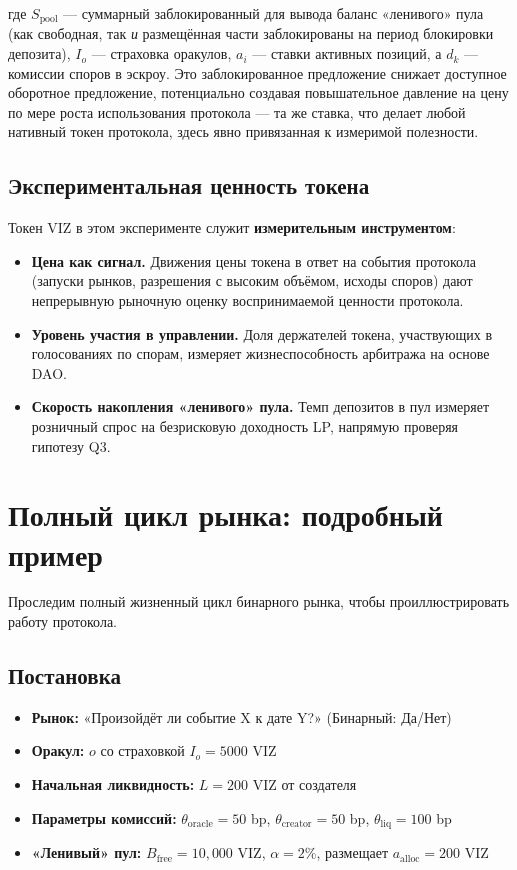 \documentclass{ledger}
\theoremstyle{plain}
\theoremstyle{remark}
\begin{document}
где $S_{\text{pool}}$ --- суммарный заблокированный для вывода баланс «ленивого»
пула (как свободная, так \emph{и} размещённая части заблокированы на период
блокировки депозита), $I_o$ --- страховка оракулов, $a_i$ --- ставки активных
позиций, а $d_k$ --- комиссии споров в эскроу. Это заблокированное предложение
снижает доступное оборотное предложение, потенциально создавая повышательное
давление на цену по мере роста использования протокола --- та же ставка, что делает
любой нативный токен протокола, здесь явно привязанная к измеримой полезности.

\subsection{Экспериментальная ценность токена}

Токен VIZ в этом эксперименте служит \textbf{измерительным инструментом}:

\begin{itemize}
  \item \textbf{Цена как сигнал.} Движения цены токена в ответ на события протокола
  (запуски рынков, разрешения с высоким объёмом, исходы споров) дают непрерывную
  рыночную оценку воспринимаемой ценности протокола.
  \item \textbf{Уровень участия в управлении.} Доля держателей токена, участвующих в
  голосованиях по спорам, измеряет жизнеспособность арбитража на основе DAO.
  \item \textbf{Скорость накопления «ленивого» пула.} Темп депозитов в пул измеряет
  розничный спрос на безрисковую доходность LP, напрямую проверяя гипотезу Q3.
\end{itemize}

\section{Полный цикл рынка: подробный пример}\label{sec:example}

Проследим полный жизненный цикл бинарного рынка, чтобы проиллюстрировать работу
протокола.

\subsection{Постановка}

\begin{itemize}
  \item \textbf{Рынок:} «Произойдёт ли событие X к дате Y?» (Бинарный: Да/Нет)
  \item \textbf{Оракул:} $o$ со страховкой $I_o = 5000$ VIZ
  \item \textbf{Начальная ликвидность:} $L = 200$ VIZ от создателя
  \item \textbf{Параметры комиссий:} $\theta_{\text{oracle}} = 50$ bp,
  $\theta_{\text{creator}} = 50$ bp, $\theta_{\text{liq}} = 100$ bp
  \item \textbf{«Ленивый» пул:} $B_{\text{free}} = 10{,}000$ VIZ, $\alpha = 2\%$,
  размещает $a_{\text{alloc}} = 200$ VIZ
\end{itemize}
\end{document}
